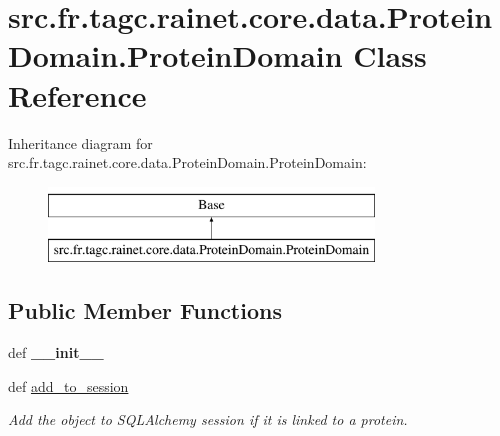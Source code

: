 \hypertarget{classsrc_1_1fr_1_1tagc_1_1rainet_1_1core_1_1data_1_1ProteinDomain_1_1ProteinDomain}{\section{src.\-fr.\-tagc.\-rainet.\-core.\-data.\-Protein\-Domain.\-Protein\-Domain Class Reference}
\label{classsrc_1_1fr_1_1tagc_1_1rainet_1_1core_1_1data_1_1ProteinDomain_1_1ProteinDomain}
}
Inheritance diagram for src.\-fr.\-tagc.\-rainet.\-core.\-data.\-Protein\-Domain.\-Protein\-Domain\-:\begin{figure}[H]
\begin{center}
\leavevmode
\includegraphics[height=2.000000cm]{classsrc_1_1fr_1_1tagc_1_1rainet_1_1core_1_1data_1_1ProteinDomain_1_1ProteinDomain}
\end{center}
\end{figure}
\subsection*{Public Member Functions}
\begin{DoxyCompactItemize}
\item 
\hypertarget{classsrc_1_1fr_1_1tagc_1_1rainet_1_1core_1_1data_1_1ProteinDomain_1_1ProteinDomain_a0900d4e2130e0687c954f4740cb86e0d}{def {\bfseries \-\_\-\-\_\-init\-\_\-\-\_\-}}\label{classsrc_1_1fr_1_1tagc_1_1rainet_1_1core_1_1data_1_1ProteinDomain_1_1ProteinDomain_a0900d4e2130e0687c954f4740cb86e0d}

\item 
\hypertarget{classsrc_1_1fr_1_1tagc_1_1rainet_1_1core_1_1data_1_1ProteinDomain_1_1ProteinDomain_a24c57d56b40aa6fd6762d2008d32262b}{def \hyperlink{classsrc_1_1fr_1_1tagc_1_1rainet_1_1core_1_1data_1_1ProteinDomain_1_1ProteinDomain_a24c57d56b40aa6fd6762d2008d32262b}{add\-\_\-to\-\_\-session}}\label{classsrc_1_1fr_1_1tagc_1_1rainet_1_1core_1_1data_1_1ProteinDomain_1_1ProteinDomain_a24c57d56b40aa6fd6762d2008d32262b}

\begin{DoxyCompactList}\small\item\em Add the object to S\-Q\-L\-Alchemy session if it is linked to a protein. \end{DoxyCompactList}\end{DoxyCompactItemize}
